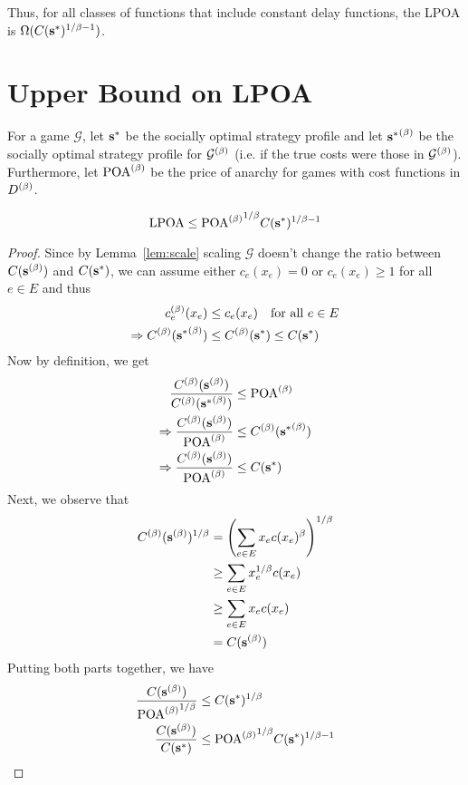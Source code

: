 \documentclass[twoside]{article}
\begin{document}
\begin{multicols}{2}
Thus, for all classes of functions that include constant delay functions, the
LPOA is $\Omega(C(\mathbf{s}^*)^{1/\beta-1})$.

\section{Upper Bound on LPOA} \label{sec:ub}
For a game $\mathcal{G}$, let $\mathbf{s}^*$ be the socially optimal strategy profile
and let ${\mathbf{s}^*}^{(\beta)}$ be the socially optimal strategy profile for
$\mathcal{G}^{(\beta)}$ (i.e. if the true costs were those in $\mathcal{G}^{(\beta)}$).
Furthermore, let $\text{POA}^{(\beta)}$ be the price of anarchy for games with cost functions in
$D^{(\beta)}$.
\begin{thm} \label{thm:lpoa}
  \[
    \text{LPOA} \le {\ensuremath{\text{POA}^{(\beta)}}}^{1/\beta} C(\mathbf{s}^*)^{1/\beta-1}
  \]
\end{thm}
\begin{proof}
  Since by Lemma~\ref{lem:scale} scaling $\mathcal{G}$ doesn't change the ratio
  between $C(\mathbf{s}^{(\beta)})$ and $C(\mathbf{s}^*)$, we can assume either $c_e(x_e) = 0$ or
  $c_e(x_e) \ge 1$ for all $e \in E$ and thus
  \begin{align*}
  c_e^{(\beta)}(x_e) &\le c_e(x_e) \quad \text{for all }e \in E \\
  \Rightarrow C^{(\beta)}({\mathbf{s}^*}^{(\beta)}) &\le C^{(\beta)}(\mathbf{s}^*) \le C(\mathbf{s}^*)
  \end{align*}
  Now by definition, we get 
  \begin{align*}
  \frac{C^{(\beta)}(\mathbf{s}^{(\beta)})}{C^{(\beta)}({\mathbf{s}^*}^{(\beta)})} &\le \text{POA}^{(\beta)} \\
  \Rightarrow \frac{C^{(\beta)}(\mathbf{s}^{(\beta)})}{\text{POA}^{(\beta)}} &\le C^{(\beta)}({\mathbf{s}^*}^{(\beta)}) \\
  \Rightarrow \frac{C^{(\beta)}(\mathbf{s}^{(\beta)})}{\text{POA}^{(\beta)}} &\le C(\mathbf{s}^*)
  \end{align*}
  Next, we observe that \begin{align*}
    C^{(\beta)}(\mathbf{s}^{(\beta)})^{1/\beta} &= \left(\sum_{e \in E} x_e c(x_e)^\beta\right)^{1/\beta}
    \\
    &\ge \sum_{e \in E} x_e^{1/\beta} c(x_e) \\
    &\ge \sum_{e \in E} x_e c(x_e) \\
    &= C(\mathbf{s}^{(\beta)})
  \end{align*}
  Putting both parts together, we have
  \begin{align*}
    \frac{C(\mathbf{s}^{(\beta)})}{{\text{POA}^{(\beta)}}^{1/\beta}} &\le C(\mathbf{s}^*)^{1/\beta} \\
    \frac{C(\mathbf{s}^{(\beta)})}{C(\mathbf{s}^*)} &\le {\ensuremath{\text{POA}^{(\beta)}}}^{1/\beta} C(\mathbf{s}^*)^{1/\beta-1}
  \end{align*}
\end{proof}



\end{multicols}
\end{document}
